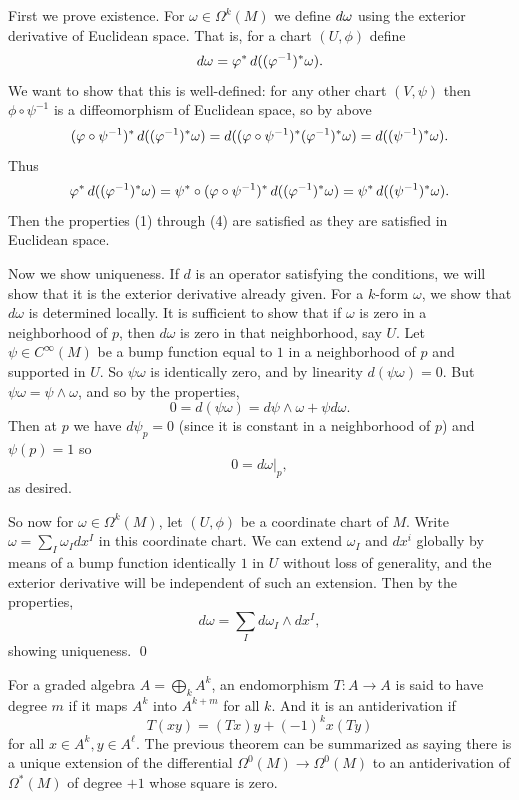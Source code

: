 \ethrm

\bproof

    First we prove existence.
    For $\omega\in\Omega^k(M)$ we define $\mathop{}\!d\omega$ using the exterior derivative of Euclidean space.
    That is, for a chart $(U,\phi)$ define
    $$ \mathop{}\!d\omega = \varphi^*\mathop{}\!d((\varphi^{-1})^*\omega) . $$
    We want to show that this is well-defined: for any other chart $(V,\psi)$ then $\phi\circ\psi^{-1}$ is a diffeomorphism of Euclidean space, so by above
    $$ (\varphi\circ\psi^{-1})^*\mathop{}\!d((\varphi^{-1})^*\omega) = \mathop{}\!d((\varphi\circ\psi^{-1})^*(\varphi^{-1})^*\omega) = \mathop{}\!d((\psi^{-1})^*\omega) . $$
    Thus
    $$ \varphi^*\mathop{}\!d((\varphi^{-1})^*\omega) = \psi^*\circ(\varphi\circ\psi^{-1})^*\mathop{}\!d((\varphi^{-1})^*\omega) = \psi^*\mathop{}\!d((\psi^{-1})^*\omega) . $$
    Then the properties (1) through (4) are satisfied as they are satisfied in Euclidean space.

    Now we show uniqueness.
    If $d$ is an operator satisfying the conditions, we will show that it is the exterior derivative already given.
    For a $k$-form $\omega$, we show that $d\omega$ is determined locally.
    It is sufficient to show that if $\omega$ is zero in a neighborhood of $p$, then $d\omega$ is zero in that neighborhood, say $U$.
    Let $\psi\in C^\infty(M)$ be a bump function equal to $1$ in a neighborhood of $p$ and supported in $U$.
    So $\psi\omega$ is identically zero, and by linearity $d(\psi\omega)=0$.
    But $\psi\omega=\psi\wedge\omega$, and so by the properties,
    $$ 0 = d(\psi\omega) = d\psi\wedge\omega + \psi d\omega . $$
    Then at $p$ we have $d\psi_p=0$ (since it is constant in a neighborhood of $p$) and $\psi(p)=1$ so
    $$ 0 = d\omega|_p , $$
    as desired.

    So now for $\omega\in\Omega^k(M)$, let $(U,\phi)$ be a coordinate chart of $M$.
    Write $\omega=\sum_I\omega_Idx^I$ in this coordinate chart.
    We can extend $\omega_I$ and $dx^i$ globally by means of a bump function identically $1$ in $U$ without loss of generality, and the exterior derivative will be independent of such an extension.
    Then by the properties,
    $$ d\omega = \sum_Id\omega_I\wedge dx^I , $$
    showing uniqueness.
    \qed

\eproof

\bnote

    For a graded algebra $A=\bigoplus_kA^k$, an endomorphism $T\colon A\to A$ is said to have {\emphcolor degree $m$} if it maps $A^k$ into $A^{k+m}$ for all $k$.
    And it is an {\emphcolor antiderivation} if
    $$ T(xy) = (Tx)y + (-1)^kx(Ty) $$
    for all $x\in A^k,y\in A^\ell$.
    The previous theorem can be summarized as saying there is a unique extension of the differential $\Omega^0(M)\to\Omega^0(M)$ to an antiderivation of $\Omega^*(M)$ of degree $+1$ whose square is zero.

